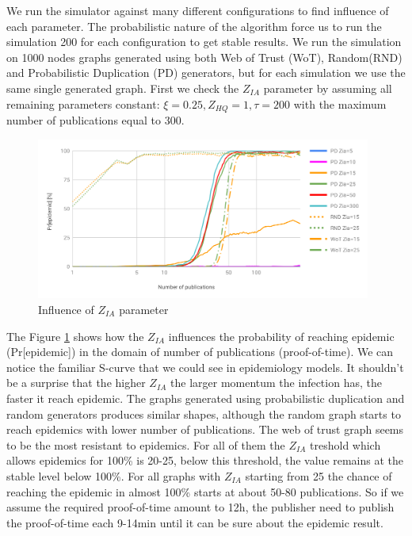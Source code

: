 \documentclass[nostrict]{szablonPG}
\begin{document}
We run the simulator against many different configurations to find influence of each parameter. The probabilistic nature of the algorithm force us to run the simulation 200 for each configuration to get stable results. We run the simulation on 1000 nodes graphs generated using both Web of Trust (WoT), Random(RND) and Probabilistic Duplication (PD) generators, but for each simulation we use the same single generated graph. First we check the $Z_{IA}$ parameter by assuming all remaining parameters constant: $\xi=0.25, Z_{HQ} = 1, \tau=200$ with the maximum number of publications equal to 300.
\begin{figure}[h!]
    \includegraphics[width=11cm]{img/influence-of-zia.png}
    \centering
    \caption{Influence of $Z_{IA}$ parameter}
    \label{fig:influence-of-zia}
\end{figure} 
The Figure \ref{fig:influence-of-zia} shows how the $Z_{IA}$ influences the probability of reaching epidemic (Pr[epidemic]) in the domain of number of publications (proof-of-time). We can notice the familiar S-curve that we could see in epidemiology models. It shouldn't be a surprise that the higher $Z_{IA}$ the larger momentum the infection has, the faster it reach epidemic. The graphs generated using probabilistic duplication and random generators produces similar shapes, although the random graph starts to reach epidemics with lower number of publications. The web of trust graph seems to be the most resistant to epidemics. For all of them the $Z_{IA}$ treshold which allows epidemics for 100\% is 20-25, below this threshold, the value remains at the stable level below 100\%. For all graphs with $Z_{IA}$ starting from 25 the chance of reaching the epidemic in almost 100\% starts at about 50-80 publications. So if we assume the required proof-of-time amount to 12h, the publisher need to publish the proof-of-time each 9-14min until it can be sure about the epidemic result.
\end{document}
